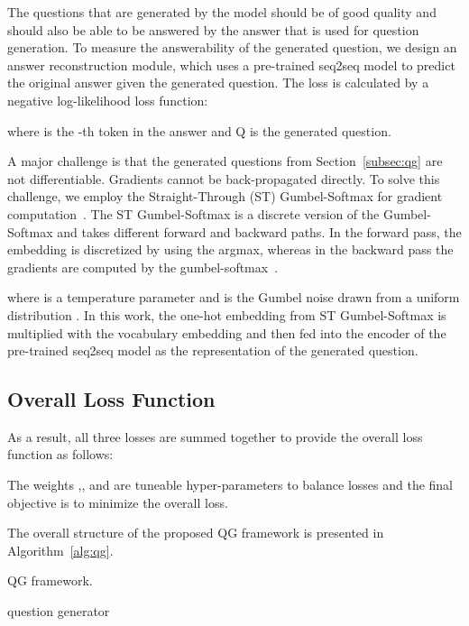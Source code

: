 \documentclass[11pt]{article}
\begin{document}
The questions that are generated by the model should be of good quality and should also be able to be answered by the answer that is used for question generation. To measure the answerability of the generated question, we design an answer reconstruction module, which uses a pre-trained seq2seq model to predict the original answer given the generated question. The loss is calculated by a negative log-likelihood loss function: 

where  is the -th token in the answer and Q is the generated question.

A major challenge is that the generated questions from Section~\ref{subsec:qg} are not differentiable.
Gradients cannot be back-propagated directly.
To solve this challenge, we employ the Straight-Through (ST) Gumbel-Softmax for gradient computation~\cite{jang-etal-2017-categorical}.
The ST Gumbel-Softmax is a discrete version of the Gumbel-Softmax and takes different forward and backward paths. In the forward pass, the embedding is discretized by using the argmax, whereas in the backward pass the gradients are computed by the gumbel-softmax~\cite{qader-etal-2019-semi,lu2021weakly}. 

where  is a temperature parameter and  is the Gumbel noise drawn from a uniform distribution . 
In this work, the one-hot embedding from ST Gumbel-Softmax is multiplied with the vocabulary embedding and then fed into the encoder of the pre-trained seq2seq model as the representation of the generated question.



\subsection{Overall Loss Function}
As a result, all three losses are summed together to provide the overall loss function  as follows:

The weights ,, and  are tuneable hyper-parameters to balance losses and the final objective is to minimize the overall loss.

The overall structure of the proposed QG framework is presented in Algorithm~\ref{alg:qg}. 


\begin{algorithm}[htbp!]
\caption{QG framework.}
\label{alg:qg}
\Return question generator 
\end{algorithm}
\vspace{-0.3cm}
\end{document}
